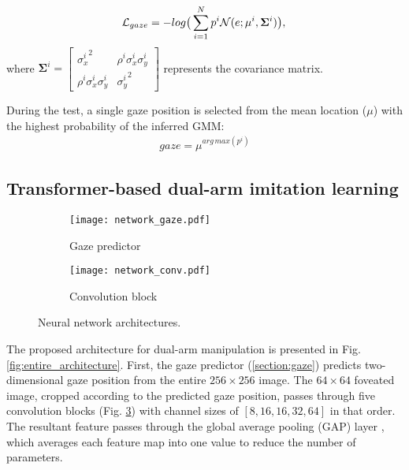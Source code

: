 \documentclass[letterpaper, 10 pt, conference]{ieeeconf}  %
\renewcommand\hl[1]{#1} %
\begin{document}
\begin{equation}
\label{eq:loss_gaze}
\mathcal{L}_{gaze} = -log \big{(}\sum_{i=1}^N p^i \mathcal{N} (e;\mu^i,\mathbf{\Sigma}^i)\big{),}
\end{equation}
\hl{where} $\mathbf{\Sigma}^i=\begin{bmatrix} {\sigma^i_x}^2 & \rho^i \sigma^i_x \sigma^i_y \\ \rho^i \sigma^i_x \sigma^i_y & {\sigma^i_y}^2 \end{bmatrix}$ represents the covariance matrix.

During the test, a single gaze position is selected from the \hl{mean} location \hl{($\mu$)} with the highest probability of the inferred \hl{GMM}:
\begin{align*}
\label{eq:gaze_selection}
{gaze} = \mu^{{arg\,max} (p^i)}
\end{align*}



\subsection{Transformer-based dual-arm imitation learning}

\begin{figure}
  \centering
  \vspace{0.0in}
  \begin{subfigure}[t]{0.25\textwidth}
    \captionsetup{width=.8\linewidth}
    \captionsetup{justification=centering}
    \texttt{[image: network\_gaze.pdf]}
    \caption{Gaze predictor}
    \label{fig:gaze}
  \end{subfigure}%
  \begin{subfigure}[t]{0.25\textwidth}
    \captionsetup{width=.8\linewidth}
    \captionsetup{justification=centering}
    \texttt{[image: network\_conv.pdf]}
    \caption{Convolution block}
    \label{fig:conv}
  \end{subfigure}%

  \captionsetup{justification=centering}
  \caption{Neural network architectures.}
 \end{figure}
 
The proposed architecture for dual-arm manipulation is presented in Fig. \ref{fig:entire_architecture}. First, the gaze predictor (\ref{section:gaze}) predicts two-dimensional gaze position from the entire $256 \times 256 $ image. The $64 \times 64$ foveated image, cropped according to the predicted gaze position, passes through five convolution blocks (Fig. \ref{fig:conv}) with channel sizes of $[8, 16, 16, 32, 64]$ in that order. The resultant feature passes through the global average pooling (GAP) layer \cite{lin2013network}, which averages each feature map into one value to reduce the number of parameters. 
\end{document}
